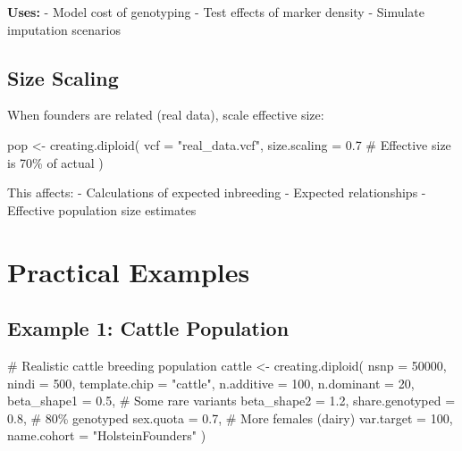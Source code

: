 \documentclass[
  letterpaper,
]{book}
\newenvironment{Shaded}{\begin{snugshade}}{\end{snugshade}}
\newcommand{\AttributeTok}[1]{\textcolor[rgb]{0.40,0.45,0.13}{#1}}
\newcommand{\CommentTok}[1]{\textcolor[rgb]{0.37,0.37,0.37}{#1}}
\newcommand{\DecValTok}[1]{\textcolor[rgb]{0.68,0.00,0.00}{#1}}
\newcommand{\FloatTok}[1]{\textcolor[rgb]{0.68,0.00,0.00}{#1}}
\newcommand{\FunctionTok}[1]{\textcolor[rgb]{0.28,0.35,0.67}{#1}}
\newcommand{\NormalTok}[1]{\textcolor[rgb]{0.00,0.23,0.31}{#1}}
\newcommand{\OtherTok}[1]{\textcolor[rgb]{0.00,0.23,0.31}{#1}}
\newcommand{\StringTok}[1]{\textcolor[rgb]{0.13,0.47,0.30}{#1}}
\begin{document}
\textbf{Uses:} - Model cost of genotyping - Test effects of marker
density - Simulate imputation scenarios

\subsection{Size Scaling}\label{size-scaling}

When founders are related (real data), scale effective size:

\begin{Shaded}
\begin{Highlighting}[]
\NormalTok{pop }\OtherTok{\textless{}{-}} \FunctionTok{creating.diploid}\NormalTok{(}
  \AttributeTok{vcf =} \StringTok{"real\_data.vcf"}\NormalTok{,}
  \AttributeTok{size.scaling =} \FloatTok{0.7}  \CommentTok{\# Effective size is 70\% of actual}
\NormalTok{)}
\end{Highlighting}
\end{Shaded}

This affects: - Calculations of expected inbreeding - Expected
relationships - Effective population size estimates

\section{Practical Examples}\label{sec-examples-pop}

\subsection{Example 1: Cattle
Population}\label{example-1-cattle-population}

\begin{Shaded}
\begin{Highlighting}[]
\CommentTok{\# Realistic cattle breeding population}
\NormalTok{cattle }\OtherTok{\textless{}{-}} \FunctionTok{creating.diploid}\NormalTok{(}
  \AttributeTok{nsnp =} \DecValTok{50000}\NormalTok{,}
  \AttributeTok{nindi =} \DecValTok{500}\NormalTok{,}
  \AttributeTok{template.chip =} \StringTok{"cattle"}\NormalTok{,}
  \AttributeTok{n.additive =} \DecValTok{100}\NormalTok{,}
  \AttributeTok{n.dominant =} \DecValTok{20}\NormalTok{,}
  \AttributeTok{beta\_shape1 =} \FloatTok{0.5}\NormalTok{,      }\CommentTok{\# Some rare variants}
  \AttributeTok{beta\_shape2 =} \FloatTok{1.2}\NormalTok{,}
  \AttributeTok{share.genotyped =} \FloatTok{0.8}\NormalTok{,   }\CommentTok{\# 80\% genotyped}
  \AttributeTok{sex.quota =} \FloatTok{0.7}\NormalTok{,         }\CommentTok{\# More females (dairy)}
  \AttributeTok{var.target =} \DecValTok{100}\NormalTok{,}
  \AttributeTok{name.cohort =} \StringTok{"HolsteinFounders"}
\NormalTok{)}
\end{Highlighting}
\end{Shaded}
\end{document}
